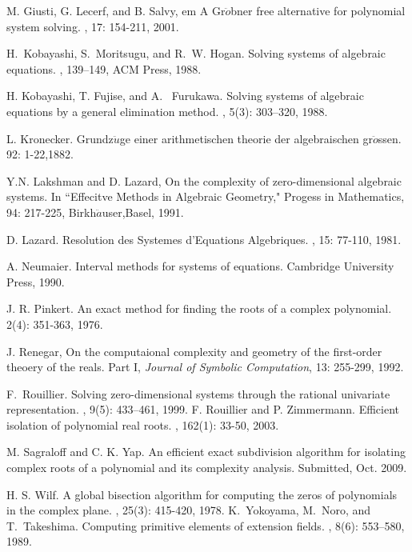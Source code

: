 \documentclass[amsthm]{JSC_LaTex_2007_Mar_12/elsart}
\begin{document}
\begin{thebibliography}{99}
 M. Giusti, G. Lecerf, and B. Salvy,
\newblock em A Gr$\ddot{o}$bner free alternative for polynomial system solving.
 , 17: 154-211, 2001.

H.~Kobayashi, S.~Moritsugu, and R.~W. Hogan.
\newblock Solving systems of algebraic equations.
, 139--149, ACM Press, 1988.

H. Kobayashi, T. Fujise, and A.~ Furukawa.
\newblock Solving systems of algebraic equations by a general elimination method.
, 5(3): 303--320, 1988.

L. Kronecker.
\newblock Grundz$\ddot{u}$ge einer arithmetischen theorie der algebraischen gr$\ddot{o}$ssen.
 92: 1-22,1882.

Y.N. Lakshman and D. Lazard,
\newblock On the complexity of zero-dimensional algebraic systems.
\newblock In ``Effecitve Methods in Algebraic Geometry," Progess in Mathematics, 94: 217-225, Birkh$\ddot{a}$user,Basel, 1991.


D. Lazard.
\newblock Resolution des Systemes d'Equations Algebriques.
, 15: 77-110, 1981.

A. Neumaier.
\newblock Interval methods for systems of equations.
\newblock Cambridge University Press, 1990.

J. R. Pinkert.
\newblock An exact method for finding the roots of a complex
polynomial.
 2(4): 351-363, 1976.  

J. Renegar,
\newblock On the computaional complexity and geometry of the first-order theoery of the reals.
\newblock Part I, {\em Journal of Symbolic Computation}, 13: 255-299, 1992.

F.~Rouillier.
\newblock Solving zero-dimensional systems through the rational univariate
  representation.
,
  9(5): 433--461, 1999.
 F. Rouillier and P. Zimmermann.
\newblock Efficient isolation of
polynomial real roots.
, {162}(1):
33-50, 2003.

M. Sagraloff and C. K. Yap.
\newblock An efficient exact subdivision algorithm for isolating complex roots
of a polynomial and its complexity analysis.
\newblock Submitted, Oct. 2009.

H. S. Wilf.
\newblock A global bisection algorithm for computing the
zeros of polynomials in the complex plane.
, 25(3): 415-420, 1978. 
K.~Yokoyama, M.~Noro, and T.~Takeshima.
\newblock Computing primitive elements of extension fields.
, 8(6): 553--580, 1989.
\end{thebibliography}
\end{document}
